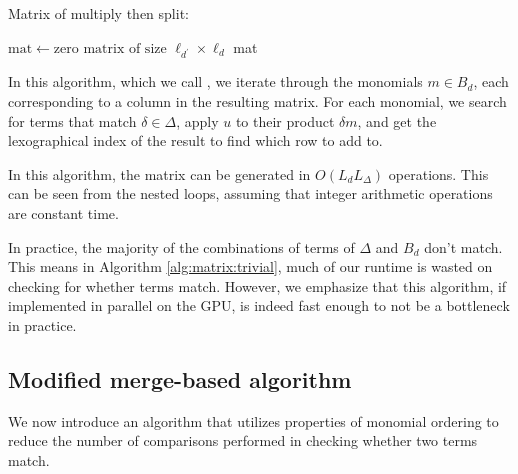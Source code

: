 \begin{algorithm}[H]
    \caption{Matrix of multiply then split: \triv}
    \label{alg:matrix:trivial}
    $\text{mat} \gets \text{zero matrix of size } \ell_{d^\prime} \times \ell_d $\;
    \Return mat
\end{algorithm}

In this algorithm, which we call \triv, we iterate through 
the monomials $m \in B_{d}$, each corresponding to a column in the
resulting matrix. For each monomial, we search for terms 
that match $\delta \in \Delta$, apply $u$ to their product $\delta m$, and 
get the lexographical index of the result to find which 
row to add to.

In this algorithm, the matrix can be generated in 
$O(L_{d}L_{\Delta})$ operations. 
This can be
seen from the nested loops, assuming that integer 
arithmetic operations are constant time.

In practice, the majority of the combinations of 
terms of $\Delta$ and $B_{d}$ don't match. This means in
Algorithm \ref{alg:matrix:trivial}, much of our 
runtime is wasted on checking for whether terms match.
However, we emphasize that this algorithm, if 
implemented in parallel on the GPU, is indeed
fast enough to not be a bottleneck in practice.

\subsection{Modified merge-based algorithm}

We now introduce an algorithm that utilizes 
properties of monomial ordering to reduce the 
number of comparisons 
performed in checking whether two terms match.

